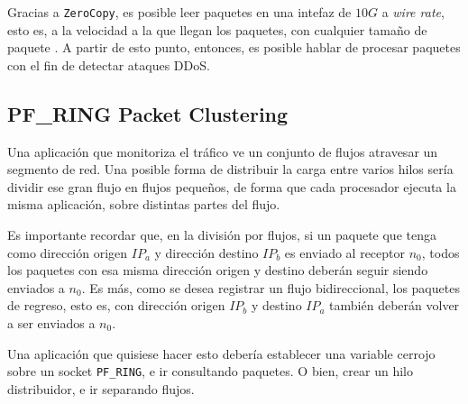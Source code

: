 Gracias a \texttt{ZeroCopy}, es posible leer paquetes en una intefaz de $10G$ a \emph{wire rate}, esto es, a la 
velocidad a la que llegan los paquetes, con cualquier tamaño de paquete \cite{PFRingZc}. A partir de esto punto, 
entonces, es posible hablar de procesar paquetes con el fin de detectar ataques \gls{DDoS}.


\subsection{PF\_RING Packet Clustering}
Una aplicación que monitoriza el tráfico ve un conjunto de flujos atravesar un segmento de red. Una posible forma de 
distribuir la carga entre varios hilos sería dividir ese gran flujo en flujos pequeños, de forma que cada procesador 
ejecuta la misma aplicación, sobre distintas partes del flujo.

Es importante recordar que, en la división por flujos, si un paquete que tenga como dirección origen $IP_a$ y dirección 
destino $IP_b$ es enviado al receptor $n_0$, todos los paquetes con esa misma dirección origen y destino deberán seguir 
siendo enviados a $n_0$. Es más, como se desea registrar un flujo bidireccional, los paquetes de regreso, esto es, con 
dirección origen $IP_b$ y destino $IP_a$ también deberán volver a ser enviados a $n_0$.

Una aplicación que quisiese hacer esto debería establecer una variable cerrojo sobre un socket \texttt{PF\_RING}, e ir 
consultando paquetes. O bien, crear un hilo distribuidor, e ir separando flujos.

